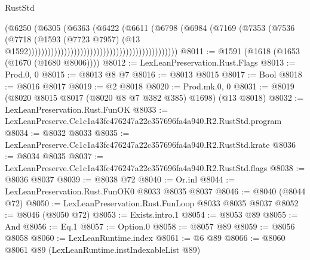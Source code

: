 \begin{lexlean}{RustStd}
\begin{coremodule}
                                                                      (@6250
                                                                        (@6305
                                                                          (@6363
                                                                            (@6422
                                                                              (@6611
                                                                                (@6798
                                                                                  (@6984
                                                                                    (@7169
                                                                                      (@7353
                                                                                        (@7536
                                                                                          (@7718
                                                                                            (@1593
                                                                                              (@7723
                                                                                                @7957)
                                                                                              (@13
                                                                                                @1592))))))))))))))))))))))))))))))))))))))))))))))
@8011 := @1591 (@1618 (@1653 (@1670 (@1680 @8006))))
@8012 := LexLeanPreservation.Rust.Flags
@8013 := Prod.{0, 0}
@8015 := @8013 @8 @7
@8016 := @8013 @8015
@8017 := Bool
@8018 := @8016 @8017
@8019 := @2 @8018
@8020 := Prod.mk.{0, 0}
@8031 := @8019 (@8020 @8015 @8017 (@8020 @8 @7 @382 @385) @1698) (@13 @8018)
@8032 := LexLeanPreservation.Rust.FunOK
@8033 := LexLeanPreserve.Cc1c1a43fc476247a22c357696fa4a940.R2.RustStd.program
@8034 := @8032 @8033
@8035 := LexLeanPreserve.Cc1c1a43fc476247a22c357696fa4a940.R2.RustStd.krate
@8036 := @8034 @8035
@8037 := LexLeanPreserve.Cc1c1a43fc476247a22c357696fa4a940.R2.RustStd.flags
@8038 := @8036 @8037
@8039 := @8038 @72
@8040 := Or.inl
@8044 := LexLeanPreservation.Rust.FunOK0 @8033 @8035 @8037
@8046 := @8040 (@8044 @72)
@8050 := LexLeanPreservation.Rust.FunLoop @8033 @8035 @8037
@8052 := @8046 (@8050 @72)
@8053 := Exists.intro.{1}
@8054 := @8053 @89
@8055 := And
@8056 := Eq.{1}
@8057 := Option.{0}
@8058 := @8057 @89
@8059 := @8056 @8058
@8060 := LexLeanRuntime.index
@8061 := @6 @89
@8066 := @8060 @8061 @89 (LexLeanRuntime.instIndexableList @89)

\end{coremodule}
\end{lexlean}
